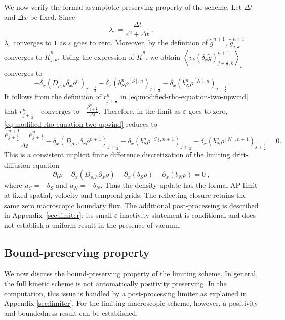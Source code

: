 \documentclass[11pt,twoside]{article}
\numberwithin{equation}{section}
\theoremstyle{plain}
\theoremstyle{nonumberplain}
\newif\ifrevisionred
\DeclareRobustCommand{\st}[1]{{\ifrevisionred\color{red}\fi #1}}
\begin{document}
{We now verify the formal asymptotic preserving property of the scheme.
Let \(\Delta t\) and \(\Delta x\) be fixed. Since
\[
\lambda_\varepsilon
=
\frac{\Delta t}{\varepsilon^2+\Delta t}\ ,
\]
\(\lambda_\varepsilon\) converges to \(1\) as \(\varepsilon\) goes to zero.
Moreover, by the definition of \(\widetilde g^{n+1}\),
\(\widetilde g_{j,k}^{n+1}\) converges to \(\widetilde K_{j,k}^{n}\).
Using the expression of \(\widetilde K^n\), we obtain \(\left\langle
v_k(\delta_x\widetilde g)_{j+\frac12,k}^{n+1}
\right\rangle_h\) converges to
\[
-\delta_x\left(D_{\rho,h}\delta_x\rho^n\right)_{j+\frac12}
-
\delta_x\left(b_S^n\rho^{[S],n}\right)_{j+\frac12}
-
\delta_x\left(b_N^n\rho^{[N],n}\right)_{j+\frac12}.
\]
It follows from the definition of \(r_{j+\frac12}^n\) in
\eqref{eq:modified-rho-equation-two-upwind} that
\(
r_{j+\frac12}^n
\quad\text{converges to}\quad
\frac{\rho_{j+\frac12}^n}{\Delta t}.
\)
Therefore, in the limit as \(\varepsilon\) goes to zero,
\eqref{eq:modified-rho-equation-two-upwind} reduces to
\begin{equation}\label{eq:limiting-density-scheme}
\frac{\rho_{j+\frac12}^{n+1}-\rho_{j+\frac12}^{n}}{\Delta t}
-
\delta_x\left(
D_{\rho,h}\delta_x\rho^{n+1}
\right)_{j+\frac12}
-
\delta_x\left(
b_S^n\rho^{[S],n+1}
\right)_{j+\frac12}
-
\delta_x\left(
b_N^n\rho^{[N],n+1}
\right)_{j+\frac12}
=0 .
\end{equation}
This is a consistent implicit finite difference discretization of the
limiting drift-diffusion equation
\[
\partial_t\rho
-
\partial_x\left(D_{\rho,h}\partial_x\rho\right)
-
\partial_x\left(b_S\rho\right)
-
\partial_x\left(b_N\rho\right)
=0\ ,
\]
where \(u_S=-b_S\) and \(u_N=-b_N\).
\st{Thus the density update has the formal AP limit at fixed spatial, velocity and temporal grids. The reflecting closure retains the same zero macroscopic boundary flux. The additional post-processing is described in Appendix~\ref{sec:limiter}; its small-$\varepsilon$ inactivity statement is conditional and does not establish a uniform result in the presence of vacuum.}

\subsection{Bound-preserving property}

We now discuss the bound-preserving property of the limiting scheme.
In general, the full kinetic scheme is not automatically positivity
preserving. In the computation, this issue is handled by a post-processing
limiter as explained in Appendix \ref{sec:limiter}. For the limiting macroscopic scheme, however, a positivity and
boundedness result can be established.

}
\end{document}
